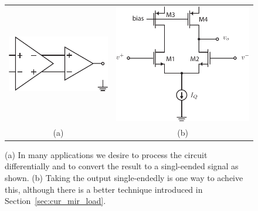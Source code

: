 \begin{figure}[tb]
\begin{center}
\begin{tabular}{cc}
\includegraphics[scale=1]{Diff_in_SE_out.pdf} &
\includegraphics[scale=1]{diffamp_SE_out_simp} \\
(a) & (b) \\
\end{tabular}
\end{center}
\caption{(a) In many applications we desire to process the circuit differentially and to convert the result to a singl-eended signal as shown.   (b) Taking the output single-endedly is one way to acheive this, although there is a better technique introduced in Section~\ref{sec:cur_mir_load}.} \label{fig:Diff_in_SE_out.pdf}
\end{figure}

